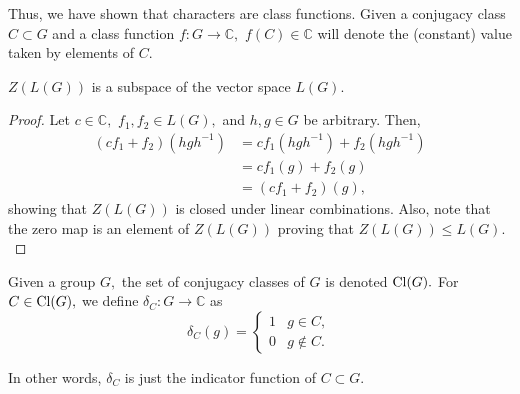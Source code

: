 Thus, we have shown that characters are class functions. Given a conjugacy class $C \subset G$ and a class function $f : G \to \mathbb{C},$ $f(C) \in \mathbb{C}$ will denote the (constant) value taken by elements of $C.$

\begin{prop}
	$Z(L(G))$ is a subspace of the vector space $L(G).$
\end{prop}
\begin{proof} 
	Let $c \in \mathbb{C},$ $f_1, f_2 \in L(G),$ and $h, g \in G$ be arbitrary. Then,
	\begin{align*} 
		(cf_1 + f_2)(hgh^{-1}) &= cf_1(hgh^{-1}) + f_2(hgh^{-1})\\
		&= cf_1(g) + f_2(g)\\
		&= (cf_1 + f_2)(g),
	\end{align*}
	showing that $Z(L(G))$ is closed under linear combinations. Also, note that the zero map is an element of $Z(L(G))$ proving that $Z(L(G)) \le L(G).$
\end{proof}

\begin{defn}
	Given a group $G,$ the set of conjugacy classes of $G$ is denoted $\operatorname{Cl}(G).$ For $C \in \operatorname{Cl}(G),$ we define $\delta_C : G \to \mathbb{C}$ as
	\begin{equation*} 
		\delta_C(g) = \begin{cases}
			1 & g \in C,\\
			0 & g \notin C.	
		\end{cases}
	\end{equation*}
\end{defn}
In other words, $\delta_C$ is just the indicator function of $C \subset G.$

